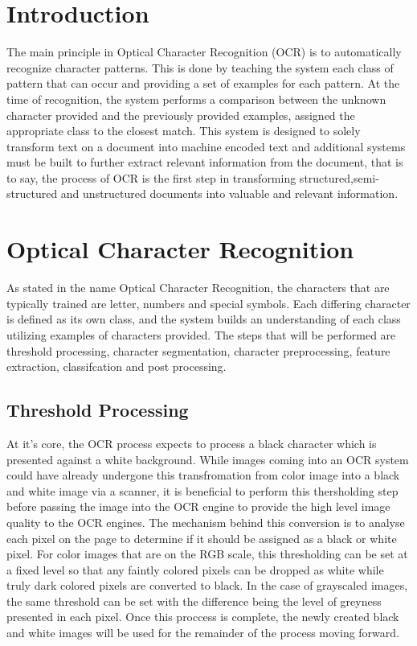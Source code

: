 \section{Introduction}

The main principle in Optical Character Recognition (OCR) is to automatically recognize character patterns. This is done by teaching the system each class of pattern that can occur and providing a set of examples for each pattern. At the time of recognition, the system performs a comparison between the unknown character provided and the previously provided examples, assigned the appropriate class to the closest match. This system is designed to solely transform text on a document into machine encoded text and additional systems must be built to further extract relevant information from the document, that is to say, the process of OCR is the first step in transforming structured,semi-structured and unstructured documents into valuable and relevant information.

\section{Optical Character Recognition}
As stated in the name Optical Character Recognition, the characters that are typically trained are letter, numbers and special symbols. Each differing character is defined as its own class, and the system builds an understanding of each class utilizing examples of characters provided. The steps that will be performed are threshold processing, character segmentation, character preprocessing, feature extraction, classifcation and post processing. 


\subsection{Threshold Processing}

At it's core, the OCR process expects to process a black character which is presented against a white background. While images coming into an OCR system could have already undergone this transfromation from color image into a black and white image via a scanner, it is beneficial to perform this thersholding step before passing the image into the OCR engine to provide the high level image quality to the OCR engines. The mechanism behind this conversion is to analyse each pixel on the page to determine if it should be assigned as a black or white pixel. For color images that are on the RGB scale, this thresholding can be set at a fixed level so that any faintly colored pixels can be dropped as white while truly dark colored pixels are converted to black. In the case of grayscaled images, the same threshold can be set with the difference being the level of greyness presented in each pixel. Once this proccess is complete, the newly created black and white images will be used for the remainder of the process moving forward\cite{hid-sp18-414-www-imagethresholding}.

